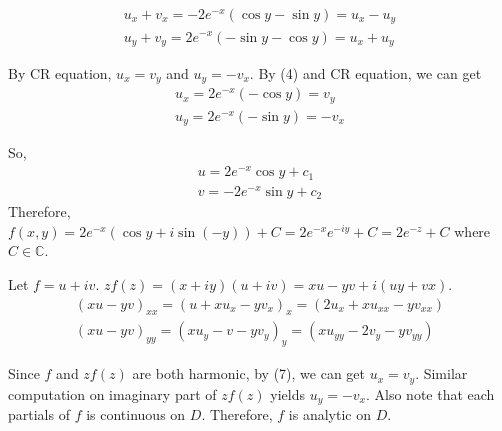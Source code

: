 \begin{problem}
	\begin{equation}
		\begin{split}
			u_x + v_x = -2e^{-x}\left( \cos y - \sin y \right) = u_x - u_y \\
			u_y + v_y = 2e^{-x} \left( -\sin y -\cos y \right) = u_x + u_y
		\end{split}
		\label{anyway}
	\end{equation}

	By CR equation, $u_x = v_y$ and $u_y = -v_x$. By (4) and CR equation, we can get
	\begin{equation}
		\begin{split}
			u_x =2 e^{-x}\left( -\cos y \right) = v_y \\
			u_y =2 e^{-x}\left( -\sin y \right) = -v_x
		\end{split}
		\label{5}
	\end{equation}

	So,
	\begin{equation}
		\begin{split}
			u =2 e^{-x} \cos y + c_1 \\
			v = -2 e^{-x} \sin y + c_2
		\end{split}
		\label{6}
	\end{equation}
	Therefore, $f(x, y) =2 e^{-x}\left( \cos y + i \sin (-y) \right) + C =2 e^{-x}e^{-iy} + C =2 e^{-z} + C$ where $C\in \mathbb{C}$.
\end{problem}

\begin{problem}
	Let $f = u+iv$. $zf(z) = \left( x+iy \right)\left( u+iv \right) = xu-yv + i\left( uy+vx \right)$. 
	\begin{equation}
		\begin{split}
		\left( xu - yv \right)_{xx} = \left( u+xu_x - yv_x \right)_x = \left( 2u_x + xu_{xx} - yv_{xx} \right)\\
		\left( xu-yv \right)_{yy} = \left( xu_y - v - yv_y \right)_{y} = \left( xu_{yy} - 2v_y - yv_{yy} \right)
	\end{split}
		\label{7}
	\end{equation}

	Since $f$ and $zf(z)$ are both harmonic, by (7), we can get $u_x = v_y$. Similar computation on imaginary part of $zf(z)$ yields $u_y = -v_x$. Also note that each partials of $f$ is continuous on $D$. Therefore, $f$ is analytic on $D$.
\end{problem}

